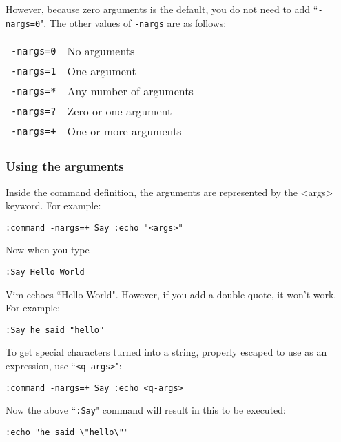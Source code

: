 However, because zero arguments is the default, you do not need to add ``\texttt{-nargs=0}".
The other values of \texttt{-nargs} are as follows:

\begin{center} \begin{tabular}{c l}
				\texttt{-nargs=0} & No arguments \\
				\texttt{-nargs=1} & One argument \\
				\texttt{-nargs=*} & Any number of arguments \\
				\texttt{-nargs=?} & Zero or one argument \\
				\texttt{-nargs=+} & One or more arguments \\
\end{tabular} \end{center}

\subsubsection{Using the arguments}
Inside the command definition, the arguments are represented by the <args> keyword.
For example:

\begin{Verbatim}[samepage=true]
 :command -nargs=+ Say :echo "<args>"
\end{Verbatim}

Now when you type

\begin{Verbatim}[samepage=true]
 :Say Hello World
\end{Verbatim}

Vim echoes ``Hello World".
However, if you add a double quote, it won't work.
For example:

\begin{Verbatim}[samepage=true]
 :Say he said "hello"
\end{Verbatim}

To get special characters turned into a string, properly escaped to use as an expression, use ``\texttt{<q-args>}":

\begin{Verbatim}[samepage=true]
 :command -nargs=+ Say :echo <q-args>
\end{Verbatim}

Now the above ``\texttt{:Say}" command will result in this to be executed:

\begin{Verbatim}[samepage=true]
 :echo "he said \"hello\""
\end{Verbatim}

